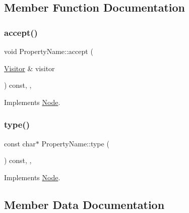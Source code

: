 \subsection{Member Function Documentation}
\mbox{\label{struct_property_name_a95857be8c40022cf788e3b11aa70cdc7}} 
\subsubsection{\texorpdfstring{accept()}{accept()}}
{\footnotesize\ttfamily void Property\+Name\+::accept (\begin{DoxyParamCaption}\item[{\hyperlink{struct_visitor}{Visitor} \&}]{visitor }\end{DoxyParamCaption}) const\hspace{0.3cm}{\ttfamily [inline]}, {\ttfamily [override]}, {\ttfamily [virtual]}}



Implements \hyperlink{struct_node_a10bd7af968140bbf5fa461298a969c71}{Node}.

\mbox{\label{struct_property_name_af0476e4cc00bc4ac43adab1050bf1bbd}} 
\subsubsection{\texorpdfstring{type()}{type()}}
{\footnotesize\ttfamily const char$\ast$ Property\+Name\+::type (\begin{DoxyParamCaption}{ }\end{DoxyParamCaption}) const\hspace{0.3cm}{\ttfamily [inline]}, {\ttfamily [override]}, {\ttfamily [virtual]}}



Implements \hyperlink{struct_node_a82f29420d0a38efcc370352528e94e9b}{Node}.



\subsection{Member Data Documentation}
\mbox{\label{struct_property_name_a734bf5af0fe32402402da12b6d5d04a1}} 
